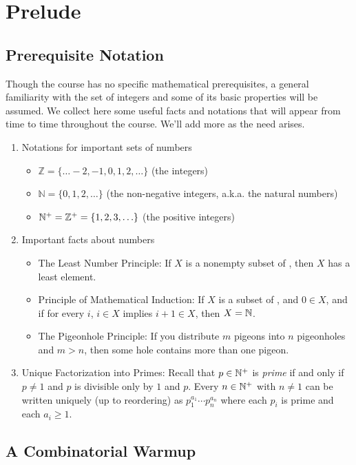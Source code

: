 \section{Prelude}

\subsection{Prerequisite Notation}


Though the course has no specific mathematical prerequisites, a general familiarity with the set of integers and some of its basic properties will be assumed. We collect here some useful facts and notations that will appear from time to time throughout the course. We'll add more as the need arises.
\begin{enumerate}
\item 
Notations for important sets of numbers
\begin{itemize}
\item 
$\mathbb{Z} = \{\ldots -2,-1,0,1,2,\ldots\}$ (the integers)
\item 
$\mathbb{N} = \{0,1,2,\ldots\}$ (the non-negative integers, a.k.a. the natural numbers)
\item 
$\mbox{$\mathbb{N}^+$}=\mathbb{Z}^+ = \{1,2,3,\ldots\}$ (the positive integers)
\end{itemize}
\item 
Important facts about numbers
\begin{itemize}
\item 
The Least Number Principle: If $X$ is a nonempty subset of \nnint, then $X$ has a least element.
\item 
Principle of Mathematical Induction: If $X$ is a subset of \nnint, and $0\in X$, and if for every $i$, $i\in X$ implies $i+1\in X$, then $X=\mbox{$\mathbb{N}$}$.
\item The Pigeonhole Principle: If you distribute $m$ pigeons into $n$ pigeonholes and $m>n$, then some hole contains more than one pigeon.
\end{itemize}
\item Unique Factorization into Primes: Recall that $p\in\mbox{$\mathbb{N}^+$}$ is \emph{prime} if and only if $p\neq1$ and $p$ is divisible only by $1$ and $p$. Every $n\in\mbox{$\mathbb{N}^+$}$ with $n\neq 1$ can be written uniquely (up to reordering) as $p_1^{a_1}\cdots p_n^{a_n}$ where each $p_i$ is prime and each $a_i\geq 1$. 
\end{enumerate}

\subsection{A Combinatorial Warmup}

